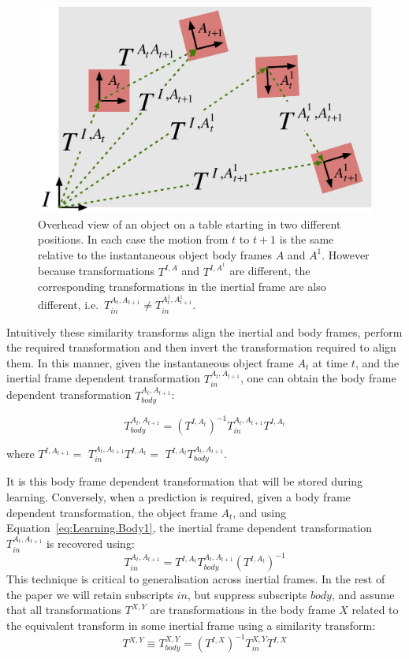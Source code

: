\begin{figure}[b!]
\centerline{\includegraphics[width=0.85\columnwidth]{similarity-new}}
\caption[Similarity]{ Overhead view of an object on a table starting in two different positions. In each case the motion from $t$ to $t+1$ is the same relative to the instantaneous object body frames $A$ and $A^{1}$. However because transformations $T^{I, A}$ and $T^{I, A^{1}}$ are different, the corresponding transformations in the inertial frame are also different, i.e.\ $T_{in}^{A_{t}, A_{t+1}} \neq T_{in}^{A^{1}_{t}, A^{1}_{t+1}}$.}
\label{fig:similarity}
\end{figure}
Intuitively these similarity transforms align the inertial and body frames, perform the required transformation and then invert the transformation required to align them. In this manner, given the instantaneous object frame $A_{t}$ at time $t$, and the inertial frame dependent transformation
$T_{in}^{A_{t}, A_{t+1}}$, one can obtain the body frame dependent
transformation $T_{body}^{A_{t}, A_{t+1}}$:

\begin{equation}
T_{body}^{A_{t}, A_{t+1}} = (T^{I, A_{t}})^{-1} T_{in}^{A_{t}, A_{t+1}} T^{I, A_{t}}
\label{eq:Learning.Body1}
\end{equation}

\noindent where $T^{I, A_{t+1}} =$ $T_{in}^{A_{t}, A_{t+1}} T^{I, A_{t}} =$ $T^{I, A_{t}} T_{body}^{A_{t}, A_{t+1}}$.

It is this body frame dependent transformation that will be stored during learning. Conversely, when a prediction is required, given a body frame dependent transformation, the object
frame $A_{t}$, and using Equation~\eqref{eq:Learning.Body1}, the
inertial frame dependent transformation $T_{in}^{A_{t}, A_{t+1}}$ is
recovered using:
\begin{equation}
T_{in}^{A_{t}, A_{t+1}} = T^{I, A_{t}} T_{body}^{A_{t}, A_{t+1}} (T^{I, A_{t}})^{-1}
\label{eq:Learning.Body2}
\end{equation}
This technique is critical to generalisation across inertial frames. In the rest of the paper we will retain subscripts $in$, but suppress subscripts $body$, and assume that all transformations $T^{X, Y}$ are transformations in the body frame $X$ related to the equivalent transform in some inertial frame using a similarity transform:
\begin{equation}
T^{X, Y} \equiv T_{body}^{X, Y} = ({T^{I, X}})^{-1} T_{in}^{X, Y} {T^{I, X}}
\label{eq:Learning.Similarity}
\end{equation}

